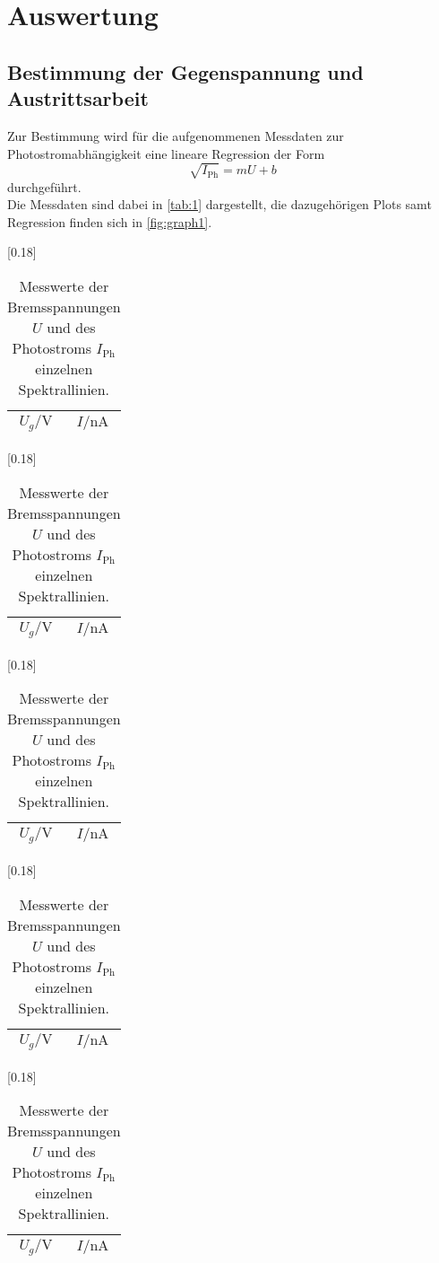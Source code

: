 \section{Auswertung}
\label{sec:auswertung}

\subsection{Bestimmung der Gegenspannung und Austrittsarbeit}

Zur Bestimmung wird für die aufgenommenen Messdaten zur Photostromabhängigkeit eine lineare Regression der Form
\begin{equation*}
    \sqrt{I_\text{Ph}} = m U + b
\end{equation*}
durchgeführt. \\

Die Messdaten sind dabei in \autoref{tab:1} dargestellt, die dazugehörigen Plots samt Regression finden sich in \autoref{fig:graph1}.

\begin{table}[H]
    \centering
    \caption{Messwerte der Bremsspannungen $U$ und des Photostroms $I_\text{Ph}$ einzelnen Spektrallinien.}
    \label{tab:1}
    [0.18\textwidth]{
      \begin{tabular}{c c}
        \toprule
        $U_g / \si{\volt}$ & $I / \si{\nano\ampere}$\\
        \midrule

        \bottomrule
      \end{tabular}
      }
    [0.18\textwidth]{
      \begin{tabular}{c c}
        \toprule
        $U_g / \si{\volt}$ & $I / \si{\nano\ampere}$\\
        \midrule

        \bottomrule
      \end{tabular}
      }
    [0.18\textwidth]{
        \begin{tabular}{c c}
          \toprule
          $U_g / \si{\volt}$ & $I / \si{\nano\ampere}$\\
          \midrule

          \bottomrule
        \end{tabular}
        }
      [0.18\textwidth]{
        \begin{tabular}{c c}
          \toprule
          $U_g / \si{\volt}$ & $I / \si{\nano\ampere}$\\
          \midrule

          \bottomrule
        \end{tabular}
        }
      [0.18\textwidth]{
        \begin{tabular}{c c}
          \toprule
          $U_g / \si{\volt}$ & $I / \si{\nano\ampere}$ \\
          \midrule

          \bottomrule
        \end{tabular}
        }
\end{table}

